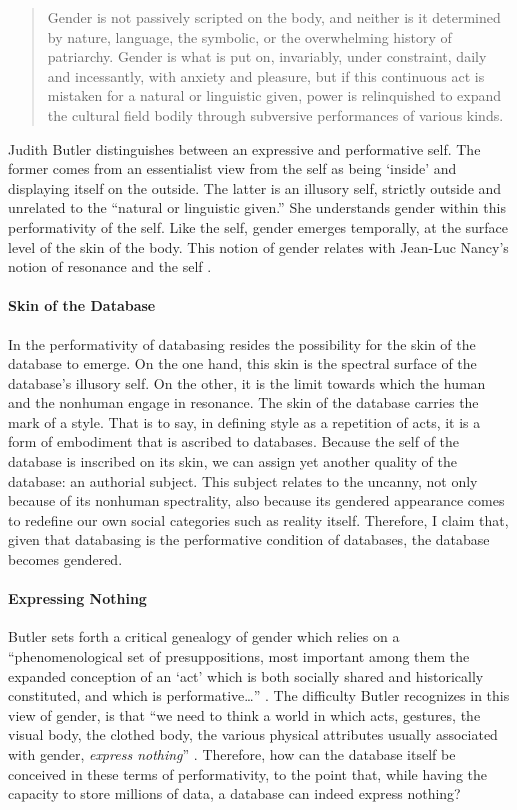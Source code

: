 \begin{quote}
	Gender is not passively scripted on the body, and neither is it determined by nature, language, the symbolic, or the overwhelming history of patriarchy. Gender is what is put on, invariably, under constraint, daily and incessantly, with anxiety and pleasure, but if this continuous act is mistaken for a natural or linguistic given, power is relinquished to expand the cultural field bodily through subversive performances of various kinds. \parencite[531]{But88:Per}
\end{quote}

Judith Butler \parencite{But88:Per} distinguishes between an expressive and performative self. The former comes from an essentialist view from the self as being `inside' and displaying itself on the outside. The latter is an illusory self, strictly outside and unrelated to the ``natural or linguistic given.'' She understands gender within this performativity of the self. Like the self, gender emerges temporally, at the surface level of the skin of the body. This notion of gender relates with Jean-Luc Nancy's notion of resonance and the self .

\paragraph{Skin of the Database}
In the performativity of databasing resides the possibility for the skin of the database to emerge. On the one hand, this skin is the spectral surface of the database's illusory self. On the other, it is the limit towards which the human and the nonhuman engage in resonance. The skin of the database carries the mark of a style. That is to say, in defining style as a repetition of acts, it is a form of embodiment that is ascribed to databases. Because the self of the database is inscribed on its skin, we can assign yet another quality of the database: an authorial subject. This subject relates to the uncanny, not only because of its nonhuman spectrality, also because its gendered appearance comes to redefine our own social categories such as reality itself. Therefore, I claim that, given that databasing is the performative condition of databases, the database becomes gendered.  

\paragraph{Expressing Nothing}
Butler sets forth a critical genealogy of gender which relies on a ``phenomenological set of presuppositions, most important among them the expanded conception of an `act' which is both socially shared and historically constituted, and which is performative\dots'' \parencite[530]{But88:Per}. The difficulty Butler recognizes in this view of gender, is that ``we need to think a world in which acts, gestures, the visual body, the clothed body, the various physical attributes usually associated with gender, \textit{express nothing}'' \parencite[530]{But88:Per}. Therefore, how can the database itself be conceived in these terms of performativity, to the point that, while having the capacity to store millions of data, a database can indeed express nothing? 

